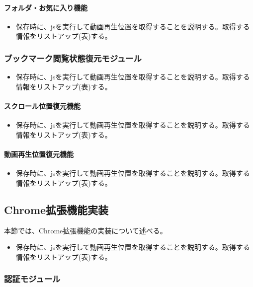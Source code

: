 \paragraph{フォルダ・お気に入り機能}
\begin{itemize}
  \item 保存時に、jsを実行して動画再生位置を取得することを説明する。取得する情報をリストアップ(表)する。
\end{itemize}

\subsubsection{ブックマーク閲覧状態復元モジュール}
\begin{itemize}
  \item 保存時に、jsを実行して動画再生位置を取得することを説明する。取得する情報をリストアップ(表)する。
\end{itemize}

\paragraph{スクロール位置復元機能}
\begin{itemize}
  \item 保存時に、jsを実行して動画再生位置を取得することを説明する。取得する情報をリストアップ(表)する。
\end{itemize}

\paragraph{動画再生位置復元機能}
\begin{itemize}
  \item 保存時に、jsを実行して動画再生位置を取得することを説明する。取得する情報をリストアップ(表)する。
\end{itemize}

\subsection{Chrome拡張機能実装}
本節では、Chrome拡張機能の実装について述べる。
\begin{itemize}
  \item 保存時に、jsを実行して動画再生位置を取得することを説明する。取得する情報をリストアップ(表)する。
\end{itemize}

\subsubsection{認証モジュール}

